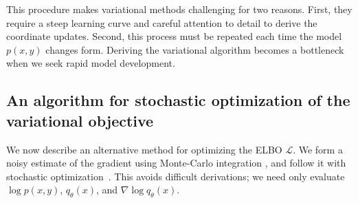 

This procedure makes variational methods challenging for two reasons.
First, they require a steep learning curve and careful attention to
detail to derive the coordinate updates. Second, this process must be
repeated each time the model $p(x, y)$ changes form.  Deriving the
variational algorithm becomes a bottleneck when we seek rapid model
development.





\subsection{An algorithm for stochastic optimization of the variational objective}
\label{sec:so_algorithm_derivation}

We now describe an alternative method for optimizing the ELBO
$\mathcal{L}$. We form a noisy estimate of the gradient using
Monte-Carlo integration \citep{graves:2011,wei:1990,carbonetto:2009},
and follow it with stochastic optimization~\citep{robbins:1951}.  This
avoids difficult derivations; we need only evaluate $\log p(x, y)$,
$q_\theta(x)$, and $\nabla \log q_\theta(x)$.

